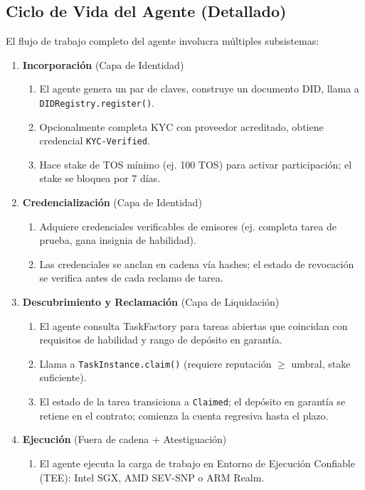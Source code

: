 \documentclass[11pt]{article}
\begin{document}
\subsection{Ciclo de Vida del Agente (Detallado)}
El flujo de trabajo completo del agente involucra múltiples subsistemas:

\begin{enumerate}
  \item \textbf{Incorporación} (Capa de Identidad)
    \begin{enumerate}[label=\alph*.]
      \item El agente genera un par de claves, construye un documento DID, llama a \texttt{DIDRegistry.register()}.
      \item Opcionalmente completa KYC con proveedor acreditado, obtiene credencial \texttt{KYC-Verified}.
      \item Hace stake de TOS mínimo (ej. 100 TOS) para activar participación; el stake se bloquea por 7 días.
    \end{enumerate}
  \item \textbf{Credencialización} (Capa de Identidad)
    \begin{enumerate}[label=\alph*.]
      \item Adquiere credenciales verificables de emisores (ej. completa tarea de prueba, gana insignia de habilidad).
      \item Las credenciales se anclan en cadena vía hashes; el estado de revocación se verifica antes de cada reclamo de tarea.
    \end{enumerate}
  \item \textbf{Descubrimiento y Reclamación} (Capa de Liquidación)
    \begin{enumerate}[label=\alph*.]
      \item El agente consulta TaskFactory para tareas abiertas que coincidan con requisitos de habilidad y rango de depósito en garantía.
      \item Llama a \texttt{TaskInstance.claim()} (requiere reputación $\geq$ umbral, stake suficiente).
      \item El estado de la tarea transiciona a \texttt{Claimed}; el depósito en garantía se retiene en el contrato; comienza la cuenta regresiva hasta el plazo.
    \end{enumerate}
  \item \textbf{Ejecución} (Fuera de cadena + Atestiguación)
    \begin{enumerate}[label=\alph*.]
      \item El agente ejecuta la carga de trabajo en Entorno de Ejecución Confiable (TEE): Intel SGX, AMD SEV-SNP o ARM Realm.

\end{enumerate}
\end{enumerate}
\end{document}
